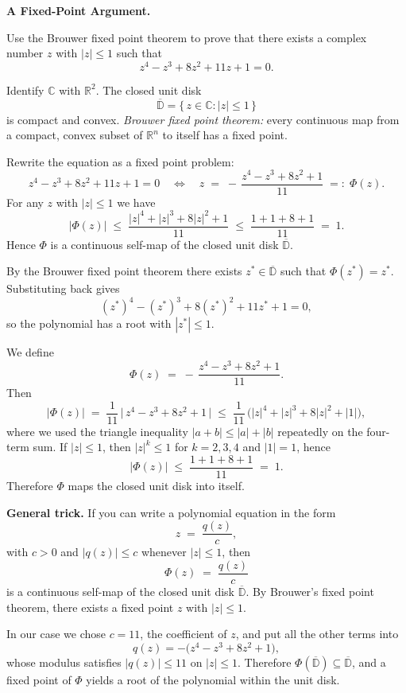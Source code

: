 \begin{problem}[CP-II-0345]
\label{prob:cp-ii-0345}
\textbf{A Fixed-Point Argument.}

\hspace*{1.5em}Use the Brouwer fixed point theorem to prove that there exists a complex number $z$ with $|z|\le 1$
such that
\[
z^4 - z^3 + 8z^2 + 11z + 1 = 0.
\]

\bigskip

Identify $\mathbb{C}$ with $\mathbb{R}^2$. The closed unit disk
\[
\overline{\mathbb{D}}=\{\, z\in\mathbb{C} : |z|\le 1 \,\}
\]
is compact and convex.
\emph{Brouwer fixed point theorem:} every continuous map from a compact, convex subset of $\mathbb{R}^n$
to itself has a fixed point.

\bigskip
\end{problem}

\begin{solution}
Rewrite the equation as a fixed point problem:
\[
z^4 - z^3 + 8z^2 + 11z + 1 = 0
\quad\Longleftrightarrow\quad
z \;=\; -\,\frac{z^4 - z^3 + 8z^2 + 1}{11} \;=:\; \Phi(z).
\]
For any $z$ with $|z|\le 1$ we have
\[
|\Phi(z)| \;\le\; \frac{|z|^4 + |z|^3 + 8|z|^2 + 1}{11}
\;\le\; \frac{1 + 1 + 8 + 1}{11}
\;=\; 1.
\]
Hence $\Phi$ is a continuous self-map of the closed unit disk $\overline{\mathbb{D}}$.

By the Brouwer fixed point theorem there exists $z^*\in \overline{\mathbb{D}}$ such that $\Phi(z^*)=z^*$.
Substituting back gives
\[
(z^*)^4 - (z^*)^3 + 8(z^*)^2 + 11 z^* + 1 = 0,
\]
so the polynomial has a root with $|z^*|\le 1$.

We define
\[
\Phi(z) \;=\; -\,\frac{z^4 - z^3 + 8z^2 + 1}{11}.
\]
Then
\[
|\Phi(z)|
\;=\;
\frac{1}{11}\,\bigl|\,z^4 - z^3 + 8z^2 + 1\,\bigr|
\;\le\;
\frac{1}{11}\,\bigl(|z|^4 + |z|^3 + 8|z|^2 + |1|\bigr),
\]
where we used the triangle inequality $|a+b|\le |a|+|b|$ repeatedly on the four-term sum.
If $|z|\le 1$, then $|z|^k\le 1$ for $k=2,3,4$ and $|1|=1$, hence
\[
|\Phi(z)| \;\le\; \frac{1+1+8+1}{11} \;=\; 1.
\]
Therefore $\Phi$ maps the closed unit disk into itself.

\bigskip
\noindent\textbf{General trick.}
If you can write a polynomial equation in the form
\[
z \;=\; \frac{q(z)}{c},
\]
with $c>0$ and $|q(z)|\le c$ whenever $|z|\le 1$, then
\[
\Phi(z) \;=\; \frac{q(z)}{c}
\]
is a continuous self-map of the closed unit disk $\overline{\mathbb{D}}$.
By Brouwer's fixed point theorem, there exists a fixed point $z$ with $|z|\le 1$.

\smallskip

In our case we chose $c=11$, the coefficient of $z$, and put all the other terms into
\[
q(z) = -\bigl(z^4 - z^3 + 8z^2 + 1\bigr),
\]
whose modulus satisfies $|q(z)|\le 11$ on $|z|\le 1$.
Therefore $\Phi(\overline{\mathbb{D}})\subseteq\overline{\mathbb{D}}$, and a fixed point
of $\Phi$ yields a root of the polynomial within the unit disk.
\end{solution}

